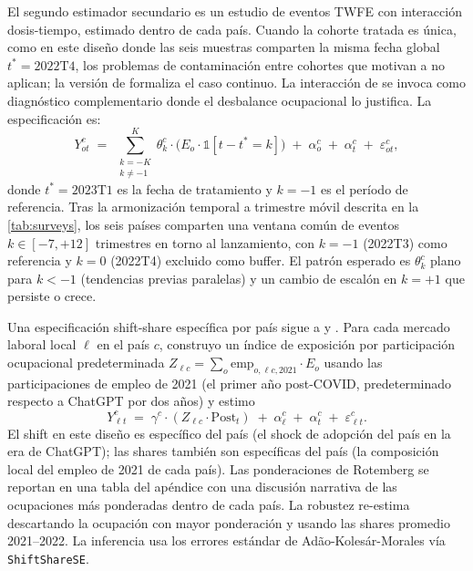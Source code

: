 El segundo estimador secundario es un estudio de eventos TWFE con interacción dosis-tiempo, estimado dentro de cada país. Cuando la cohorte tratada es única, como en este diseño donde las seis muestras comparten la misma fecha global $t^\ast = 2022\text{T4}$, los problemas de contaminación entre cohortes que motivan a \citet{SunAbraham2021_eventstudy} no aplican; la versión de \citet{DeChaisemartinHPVB2022_continuous} formaliza el caso continuo. La interacción de \citet{SunAbraham2021_eventstudy} se invoca como diagnóstico complementario donde el desbalance ocupacional lo justifica. La especificación es:
\begin{equation}
Y_{ot}^c \;=\; \sum_{\substack{k=-K \\ k \neq -1}}^{K} \theta_k^c \cdot \bigl(E_{o} \cdot \mathbb{1}[t - t^\ast = k]\bigr) \;+\; \alpha_{o}^c \;+\; \alpha_{t}^c \;+\; \varepsilon_{ot}^c,
\label{eq:event_study}
\end{equation}
donde $t^\ast = 2023\text{T1}$ es la fecha de tratamiento y $k = -1$ es el período de referencia. Tras la armonización temporal a trimestre móvil descrita en la \cref{tab:surveys}, los seis países comparten una ventana común de eventos $k \in [-7, +12]$ trimestres en torno al lanzamiento, con $k = -1$ (2022T3) como referencia y $k = 0$ (2022T4) excluido como buffer. El patrón esperado es $\theta_k^c$ plano para $k < -1$ (tendencias previas paralelas) y un cambio de escalón en $k = +1$ que persiste o crece.

Una especificación shift-share específica por país sigue a \citet{GoldsmithPinkham2020_bartik} y \citet{BorusyakHJ2022_shiftshare}. Para cada mercado laboral local $\ell$ en el país $c$, construyo un índice de exposición por participación ocupacional predeterminada $Z_{\ell c} = \sum_o \text{emp}_{o, \ell c, 2021} \cdot E_o$ usando las participaciones de empleo de 2021 (el primer año post-COVID, predeterminado respecto a ChatGPT por dos años) y estimo
\begin{equation}
Y_{\ell t}^c \;=\; \gamma^c \cdot (Z_{\ell c} \cdot \text{Post}_t) \;+\; \alpha_{\ell}^c \;+\; \alpha_{t}^c \;+\; \varepsilon_{\ell t}^c.
\label{eq:bartik}
\end{equation}
El shift en este diseño es específico del país (el shock de adopción del país en la era de ChatGPT); las shares también son específicas del país (la composición local del empleo de 2021 de cada país). Las ponderaciones de Rotemberg se reportan en una tabla del apéndice con una discusión narrativa de las ocupaciones más ponderadas dentro de cada país. La robustez re-estima descartando la ocupación con mayor ponderación y usando las shares promedio 2021--2022. La inferencia usa los errores estándar de Adão-Kolesár-Morales vía \texttt{ShiftShareSE}.


